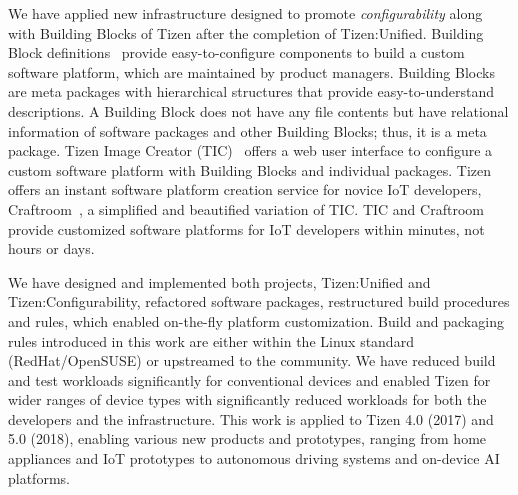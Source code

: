 We have applied new infrastructure designed to promote \textit{configurability} along with Building Blocks of Tizen after the completion of Tizen:Unified.
Building Block definitions~\cite{3TizenWikiBB,4LeeKeynote2017TDC} provide easy-to-configure components to build a custom software platform, which are maintained by product managers.
Building Blocks are meta packages with hierarchical structures that provide easy-to-understand descriptions.
A Building Block does not have any file contents but have relational information of software packages and other Building Blocks; thus, it is a meta package.
Tizen Image Creator (TIC)~\cite{2Ham2017TDC} offers a web user interface to configure a custom software platform with Building Blocks and individual packages.
Tizen offers an instant software platform creation service for novice IoT developers, Craftroom~\cite{5CraftroomURL}, a simplified and beautified variation of TIC.
TIC and Craftroom provide customized software platforms for IoT developers within minutes, not hours or days.

We have designed and implemented both projects, Tizen:Unified and Tizen:Configurability, refactored software packages, restructured build procedures and rules, which enabled on-the-fly platform customization.
Build and packaging rules introduced in this work are either within the Linux standard (RedHat/OpenSUSE) or upstreamed to the community.
We have reduced build and test workloads significantly for conventional devices and enabled Tizen for wider ranges of device types with significantly reduced workloads for both the developers and the infrastructure.
This work is applied to Tizen 4.0 (2017) and 5.0 (2018), enabling various new products and prototypes, ranging from home appliances and IoT prototypes to autonomous driving systems and on-device AI platforms.